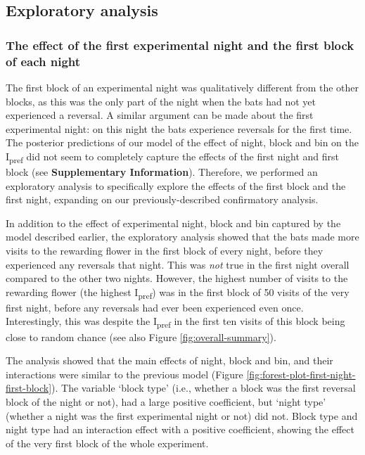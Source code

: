 \documentclass[
]{article}
\begin{document}
\hypertarget{exploratory-analysis}{%
\subsection{Exploratory analysis}\label{exploratory-analysis}}

\hypertarget{the-effect-of-the-first-experimental-night-and-the-first-block-of-each-night}{%
\subsubsection{The effect of the first experimental night and the first block of each night}\label{the-effect-of-the-first-experimental-night-and-the-first-block-of-each-night}}

The first block of an experimental night was qualitatively different from the other blocks, as this was the only part of the night when the bats had not yet experienced a reversal. A similar argument can be made about the first experimental night: on this night the bats experience reversals for the first time. The posterior predictions of our model of the effect of night, block and bin on the I\textsubscript{pref} did not seem to completely capture the effects of the first night and first block (see \textbf{Supplementary Information}). Therefore, we performed an exploratory analysis to specifically explore the effects of the first block and the first night, expanding on our previously-described confirmatory analysis.

In addition to the effect of experimental night, block and bin captured by the model described earlier, the exploratory analysis showed that the bats made more visits to the rewarding flower in the first block of every night, before they experienced any reversals that night. This was \emph{not} true in the first night overall compared to the other two nights. However, the highest number of visits to the rewarding flower (the highest I\textsubscript{pref}) was in the first block of 50 visits of the very first night, before any reversals had ever been experienced even once. Interestingly, this was despite the I\textsubscript{pref} in the first ten visits of this block being close to random chance (see also Figure \ref{fig:overall-summary}).

The analysis showed that the main effects of night, block and bin, and their interactions were similar to the previous model (Figure \ref{fig:forest-plot-first-night-first-block}). The variable `block type' (i.e., whether a block was the first reversal block of the night or not), had a large positive coefficient, but `night type' (whether a night was the first experimental night or not) did not. Block type and night type had an interaction effect with a positive coefficient, showing the effect of the very first block of the whole experiment.
\end{document}
